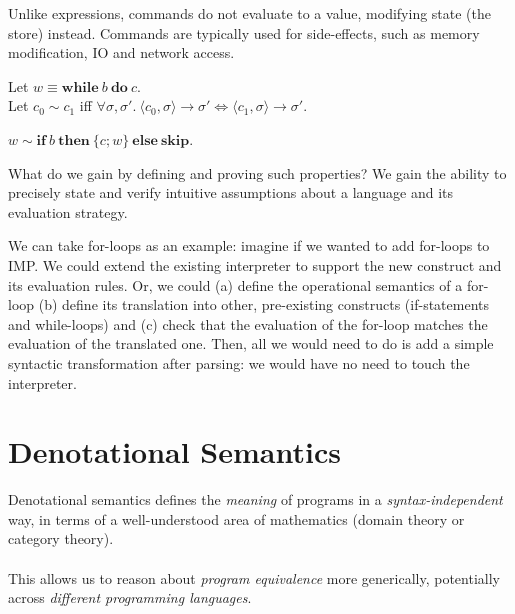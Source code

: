Unlike expressions, commands do not evaluate to a value, modifying state (the
store) instead. Commands are typically used for side-effects, such as memory
modification, IO and network access.

\begin{frame}
    Let $w \equiv \mathbf{while}\ b\ \mathbf{do}\ c$.\\
    Let $c_0 \sim c_1$ iff $\forall \sigma, \sigma'.\ \langle c_0, \sigma
    \rangle \rightarrow \sigma' \Leftrightarrow \langle c_1, \sigma \rangle
    \rightarrow \sigma'$.
    \begin{theorem}
        $w \sim \mathbf{if}\ b\ \mathbf{then}\ \{c; w\}\ \mathbf{else}\ \mathbf{skip}$.
    \end{theorem}
\end{frame}

What do we gain by defining and proving such properties? We gain the ability
to precisely state and verify intuitive assumptions about a language and its
evaluation strategy.

We can take for-loops as an example: imagine if we wanted to add for-loops to
IMP. We could extend the existing interpreter to support the new construct
and its evaluation rules. Or, we could (a) define the operational semantics
of a for-loop (b) define its translation into other, pre-existing constructs
(if-statements and while-loops) and (c) check that the evaluation of the
for-loop matches the evaluation of the translated one. Then, all we would
need to do is add a simple syntactic transformation after parsing: we would
have no need to touch the interpreter.

\section{Denotational Semantics}

\begin{frame}
    Denotational semantics defines the \emph{meaning} of programs in a
    \emph{syntax-independent} way, in terms of a well-understood area of
    mathematics (domain theory or category theory).\\~\\
    This allows us to reason about \emph{program equivalence} more
    generically, potentially across \emph{different programming languages}.
\end{frame}

